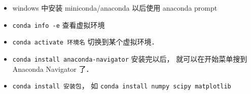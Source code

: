 
\begin{itemize}
\item windows 中安装 miniconda/anaconda 以后使用 anaconda prompt
\item \verb|conda info -e| 查看虚拟环境
\item \verb|conda activate 环境名| 切换到某个虚拟环境．
\item \verb|conda install anaconda-navigator| 安装完以后， 就可以在开始菜单搜到 Anaconda Navigator 了．
\item \verb|conda install 安装包|， 如 \verb|conda install numpy scipy matplotlib|
\end{itemize}
